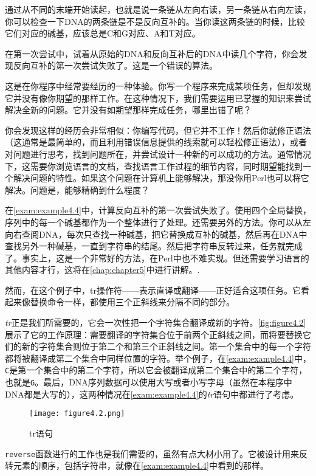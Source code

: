 通过从不同的末端开始读起，也就是说一条链从左向右读，另一条链从右向左读，你可以检查一下DNA的两条链是不是反向互补的。当你读这两条链的时候，比较它们对应的碱基，应该总是C和G对应、A和T对应。

在第一次尝试中，试着从原始的DNA和反向互补后的DNA中读几个字符，你会发现反向互补的第一次尝试失败了。这是一个错误的算法。

这是在你程序中经常要经历的一种体验。你写一个程序来完成某项任务，但却发现它并没有像你期望的那样工作。在这种情况下，我们需要运用已掌握的知识来尝试解决全新的问题。它并没有如期望那样完成任务，哪里出错了呢？

你会发现这样的经历会非常相似：你编写代码，但它并不工作！然后你就修正语法（这通常是最简单的，而且利用错误信息提供的线索就可以轻松修正语法），或者对问题进行思考，找到问题所在，并尝试设计一种新的可以成功的方法。通常情况下，这需要你浏览语言的文档，查找语言工作过程的细节内容，同时期望能找到一个解决问题的特性。如果这个问题在计算机上能够解决，那没你用Perl也可以将它解决。问题是，能够精确到什么程度？

在\autoref{exam:example4.4}中，计算反向互补的第一次尝试失败了。使用四个全局替换，序列中的每一个碱基都作为一个整体进行了处理。还需要另外的方法。你可以从左向右查阅DNA，每次只查找一种碱基，把它替换成互补的碱基，然后再在DNA中查找另外一种碱基，一直到字符串的结尾。然后把字符串反转过来，任务就完成了。事实上，这是一个非常好的方法，在Perl中也不难实现。但还需要学习语言的其他内容才行，这将在\autoref{chap:chapter5}中进行讲解。.

然而，在这个例子中，tr操作符——表示直译或翻译——正好适合这项任务。它看起来像替换命令一样，都使用三个正斜线来分隔不同的部分。

\textit{tr}正是我们所需要的，它会一次性把一个字符集合翻译成新的字符。\autoref{fig:figure4.2}展示了它的工作原理：需要翻译的字符集合位于前两个正斜线之间，而将要替换它们的新的字符集合则位于第二个和第三个正斜线之间。第一个集合中的每一个字符都将被翻译成第二个集合中同样位置的字符。举个例子，在\autoref{exam:example4.4}中，\verb|C|是第一个集合中的第二个字符，所以它会被翻译成第二个集合中的第二个字符，也就是\verb|G|。最后，DNA序列数据可以使用大写或者小写字母（虽然在本程序中DNA都是大写的），这两种情况在\autoref{exam:example4.4}的\textit{tr}语句中都进行了考虑。

\begin{figure}
  \centering
  \texttt{[image: figure4.2.png]}
  \caption{tr语句}
  \label{fig:figure4.2}
\end{figure}

\verb|reverse|函数进行的工作也是我们需要的，虽然有点大材小用了。它被设计用来反转元素的顺序，包括字符串，就像在\autoref{exam:example4.4}中看到的那样。

